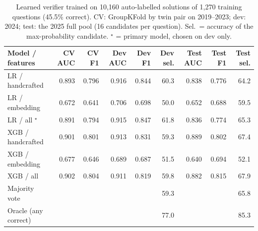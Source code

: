 \begin{table}[t]
\centering
\footnotesize
\caption{Learned verifier trained on 10,160 auto-labelled solutions of 1,270 training questions (45.5\% correct). CV: GroupKFold by twin pair on 2019--2023; dev: 2024; test: the 2025 full pool (16 candidates per question). Sel.\ = accuracy of the max-probability candidate. $^\star$ = primary model, chosen on dev only.}
\label{tab:verifier}
\setlength{\tabcolsep}{3.5pt}
\begin{tabular}{lrrrrrrrr}
\toprule
Model / features & CV AUC & CV F1 & Dev AUC & Dev F1 & Dev sel. & Test AUC & Test F1 & Test sel. \\
\midrule
LR / handcrafted & 0.893 & 0.796 & 0.916 & 0.844 & 60.3 & 0.838 & 0.776 & 64.2 \\
LR / embedding & 0.672 & 0.641 & 0.706 & 0.698 & 50.0 & 0.652 & 0.688 & 59.5 \\
LR / all $^\star$ & 0.891 & 0.794 & 0.915 & 0.847 & 61.8 & 0.836 & 0.774 & 65.3 \\
XGB / handcrafted & 0.901 & 0.801 & 0.913 & 0.831 & 59.3 & 0.889 & 0.802 & 67.4 \\
XGB / embedding & 0.677 & 0.646 & 0.689 & 0.687 & 51.5 & 0.640 & 0.694 & 52.1 \\
XGB / all & 0.902 & 0.804 & 0.911 & 0.819 & 59.8 & 0.882 & 0.815 & 67.9 \\
\midrule
Majority vote &  &  &  &  & 59.3 &  &  & 65.8 \\
Oracle (any correct) &  &  &  &  & 77.0 &  &  & 85.3 \\
\bottomrule
\end{tabular}
\end{table}
